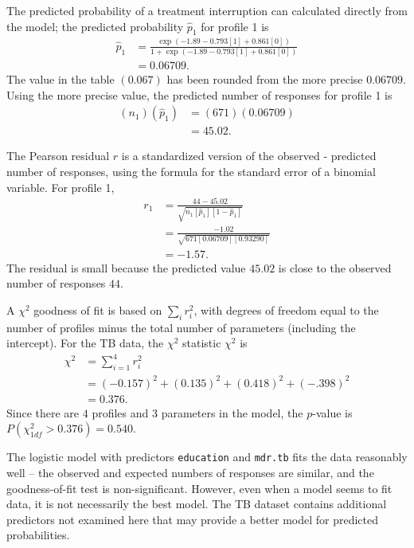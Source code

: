 The predicted probability of a treatment interruption can calculated directly from the model; the predicted probability $\hat{p}_1$ for profile 1 is
\begin{align*}
     \hat{p}_1 &=   \frac{\exp(-1.89 - 0.793[1] + 0.861[0])}
       {1 + \exp(-1.89 - 0.793[1] + 0.861[0])} \\
       &= 0.06709.
\end{align*}
The value in the table $(0.067)$ has been rounded from the more precise $0.06709$.  Using the more precise value, the predicted number of responses for profile 1 is
\begin{align*}
    (n_1)(\hat{p}_1) &= (671)(0.06709) \\
    &= 45.02.
\end{align*}

The Pearson residual $r$ is a standardized version of the observed - predicted number of responses, using the formula for the standard error of a binomial variable.  For profile 1,
\begin{align*}
   r_1 &=  \frac{44 - 45.02}{\sqrt{n_1[\hat{p}_1][1 - \hat{p}_1]}} \\
       &= \frac{-1.02}{\sqrt{671[0.06709][0.93290]}} \\
       &= -1.57.
\end{align*}
The residual is small because the predicted value $45.02$ is close to the observed number of responses $44$.

 A $\chi^2$ goodness of fit is based on $\sum_i r_i^2$, with degrees of freedom equal to the number of profiles minus the total number of parameters (including the intercept).  For the TB data, the $\chi^2$ statistic $\chi^2$ is
\begin{align*}
   \chi^2 &= \sum_{i = 1}^4 r_i^2 \\
       &= (-0.157)^2 + (0.135)^2 + (0.418)^2 + (-.398)^2 \\
       &= 0.376.
\end{align*}
Since there are $4$ profiles and $3$ parameters in the model, the $p$-value is $P(\chi^2_{1df} > 0.376) = 0.540$.

The logistic model with predictors \texttt{education} and \texttt{mdr.tb}  fits the data reasonably well -- the observed and expected numbers of responses are similar, and the goodness-of-fit test is non-significant.  However, even when a model seems to fit data, it is not necessarily the best model. The TB dataset contains additional predictors not examined here that may provide a better model for predicted probabilities.

